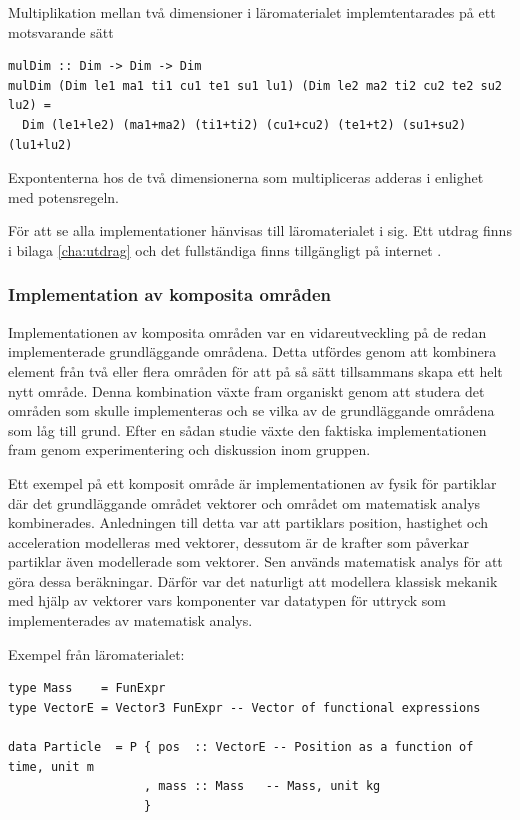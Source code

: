 \begin{draft}
Multiplikation mellan två dimensioner i läromaterialet implemtentarades på ett
motsvarande sätt

\begin{lstlisting}[frame=none, belowskip=-0.5\baselineskip, xleftmargin=0.5in]
mulDim :: Dim -> Dim -> Dim
mulDim (Dim le1 ma1 ti1 cu1 te1 su1 lu1) (Dim le2 ma2 ti2 cu2 te2 su2 lu2) =
  Dim (le1+le2) (ma1+ma2) (ti1+ti2) (cu1+cu2) (te1+t2) (su1+su2) (lu1+lu2)
\end{lstlisting}

Expontenterna hos de två dimensionerna som multipliceras adderas i enlighet med
potensregeln.

För att se alla implementationer hänvisas till läromaterialet i sig. Ett utdrag
finns i bilaga \ref{cha:utdrag} och det fullständiga finns tillgängligt på internet \cite{LYAP}.

\subsubsection{Implementation av komposita områden}

Implementationen av komposita områden var en vidareutveckling på de redan
implementerade grundläggande områdena. Detta utfördes genom att kombinera
element från två eller flera områden för att på så sätt tillsammans skapa ett
helt nytt område. Denna kombination växte fram organiskt genom att studera det
områden som skulle implementeras och se vilka av de grundläggande områdena som
låg till grund. Efter en sådan studie växte den faktiska implementationen fram
genom experimentering och diskussion inom gruppen.

Ett exempel på ett komposit område är implementationen av fysik för partiklar
där det grundläggande området vektorer och området om matematisk analys
kombinerades. Anledningen till detta var att partiklars position, hastighet och
acceleration modelleras med vektorer, dessutom är de krafter som påverkar
partiklar även modellerade som vektorer. Sen används matematisk analys för att
göra dessa beräkningar. Därför var det naturligt att modellera klassisk mekanik
med hjälp av vektorer vars komponenter var datatypen för uttryck som
implementerades av matematisk analys.

Exempel från läromaterialet:
\begin{lstlisting}[frame=none, belowskip=-0.5\baselineskip, xleftmargin=0.5in]
type Mass    = FunExpr
type VectorE = Vector3 FunExpr -- Vector of functional expressions

data Particle  = P { pos  :: VectorE -- Position as a function of time, unit m
                   , mass :: Mass   -- Mass, unit kg
                   }
\end{lstlisting}


\end{draft}
